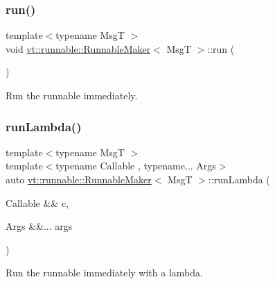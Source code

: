\subsubsection{\texorpdfstring{run()}{run()}}
{\footnotesize\ttfamily template$<$typename MsgT $>$ \\
void \hyperlink{structvt_1_1runnable_1_1_runnable_maker}{vt\+::runnable\+::\+Runnable\+Maker}$<$ MsgT $>$\+::run (\begin{DoxyParamCaption}{ }\end{DoxyParamCaption})\hspace{0.3cm}{\ttfamily [inline]}}



Run the runnable immediately. 

\mbox{\label{structvt_1_1runnable_1_1_runnable_maker_a7f36cd1bb5c957840dfbe108fc1983f6}} 
\subsubsection{\texorpdfstring{run\+Lambda()}{runLambda()}}
{\footnotesize\ttfamily template$<$typename MsgT $>$ \\
template$<$typename Callable , typename... Args$>$ \\
auto \hyperlink{structvt_1_1runnable_1_1_runnable_maker}{vt\+::runnable\+::\+Runnable\+Maker}$<$ MsgT $>$\+::run\+Lambda (\begin{DoxyParamCaption}\item[{Callable \&\&}]{c,  }\item[{Args \&\&...}]{args }\end{DoxyParamCaption})\hspace{0.3cm}{\ttfamily [inline]}}



Run the runnable immediately with a lambda. 

\mbox{\label{structvt_1_1runnable_1_1_runnable_maker_aa0ae94d80e43385c18ee1e2afbce59a2}} 
